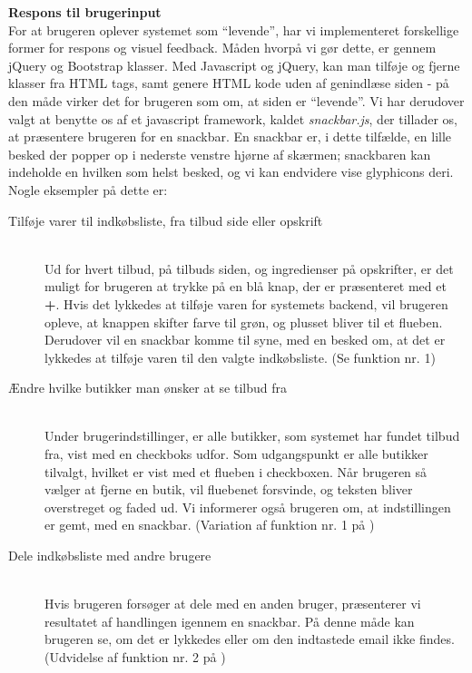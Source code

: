 \textbf{Respons til brugerinput}\hfill\\
For at brugeren oplever systemet som ``levende'', har vi implementeret forskellige former for respons og visuel feedback.
Måden hvorpå vi gør dette, er gennem jQuery og Bootstrap klasser.
Med Javascript og jQuery, kan man tilføje og fjerne klasser fra HTML tags, samt genere HTML kode uden af genindlæse siden - på den måde virker det for brugeren som om, at siden er ``levende''.
Vi har derudover valgt at benytte os af et javascript framework, kaldet \textit{snackbar.js}, der tillader os, at præsentere brugeren for en snackbar.
En snackbar er, i dette tilfælde, en lille besked der popper op i nederste venstre hjørne af skærmen; snackbaren kan indeholde en hvilken som helst besked, og vi kan endvidere vise glyphicons deri.
Nogle eksempler på dette er:
\begin{description}
\item[Tilføje varer til indkøbsliste, fra tilbud side eller opskrift]\hfill\\
Ud for hvert tilbud, på tilbuds siden, og ingredienser på opskrifter, er det muligt for brugeren at trykke på en blå knap, der er præsenteret med et \textbf{+}. 
Hvis det lykkedes at tilføje varen for systemets backend, vil brugeren opleve, at knappen skifter farve til grøn, og plusset bliver til et flueben.
Derudover vil en snackbar komme til syne, med en besked om, at det er lykkedes at tilføje varen til den valgte indkøbsliste.
(Se  funktion nr. 1)
\item[Ændre hvilke butikker man ønsker at se tilbud fra]\hfill\\
Under brugerindstillinger, er alle butikker, som systemet har fundet tilbud fra, vist med en checkboks udfor.
Som udgangspunkt er alle butikker tilvalgt, hvilket er vist med et flueben i checkboxen.
Når brugeren så vælger at fjerne en butik, vil fluebenet forsvinde, og teksten bliver overstreget og faded ud.
Vi informerer også brugeren om, at indstillingen er gemt, med en snackbar.
(Variation af funktion nr. 1 på )
\item[Dele indkøbsliste med andre brugere]\hfill\\
Hvis brugeren forsøger at dele med en anden bruger, præsenterer vi resultatet af handlingen igennem en snackbar.
På denne måde kan brugeren se, om det er lykkedes eller om den indtastede email ikke findes.
(Udvidelse af funktion nr. 2 på )
\end{description}


